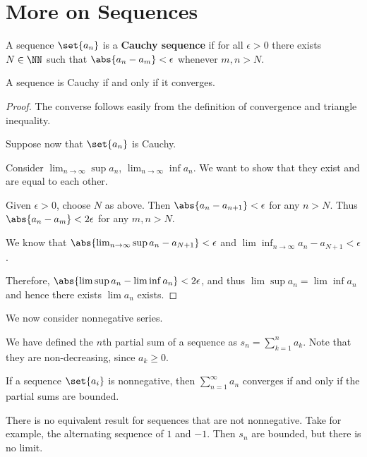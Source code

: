 \documentclass[11pt]{scrartcl}
\begin{document}
\section{More on Sequences}

\begin{definition}
  A sequence $\set{a_n}$ is a \textbf{Cauchy sequence} if for all
  $\epsilon > 0$ there exists $N\in \NN$ such that
  $\abs{a_n-a_m} < \epsilon$ whenever $m, n > N$.
\end{definition}

\begin{theorem}
A sequence is Cauchy if and only if it converges.
\end{theorem}

\begin{proof}
  \hfill

The converse follows easily from the definition of convergence and triangle inequality.

Suppose now that $\set{a_n}$ is Cauchy.


Consider $\lim_{n\to \infty} \sup a_n$, $\lim_{n\to\infty}\inf
a_n$. We want to show that they exist and are equal to each other.

Given $\epsilon > 0$, choose $N$ as above. Then
$\abs{a_n-a_{n+1}} < \epsilon$ for any $n > N$. Thus
$\abs{a_n-a_m} < 2\epsilon$ for any $m, n > N$.

We know that $\abs{\lim_{n\to\infty} \sup a_n - a_{N+1}} < \epsilon$
and $\lim \inf_{n\to \infty} a_n - a_{N+1} < \epsilon$.

Therefore, $\abs{\lim \sup a_n - \lim \inf a_n} < 2\epsilon$, and thus
$\lim \sup a_n = \lim \inf a_n$ and hence there exists $\lim a_n$
exists.
\end{proof}

We now consider nonnegative series.

We have defined the $n$th partial sum of a sequence as $s_n = \sum_{k=1}^na_k$. Note that they are non-decreasing, since $a_k\geq 0$.

\begin{theorem}
  If a sequence $\set{a_i}$ is nonnegative, then
  $\sum_{n=1}^{\infty} a_n$ converges if and only if the partial sums
  are bounded.
\end{theorem}
\begin{remark}
There is no equivalent result for sequences that are not nonnegative. Take for example, the alternating sequence of $1$ and $-1$. Then $s_n$ are bounded, but there is no limit.
\end{remark}
\end{document}
